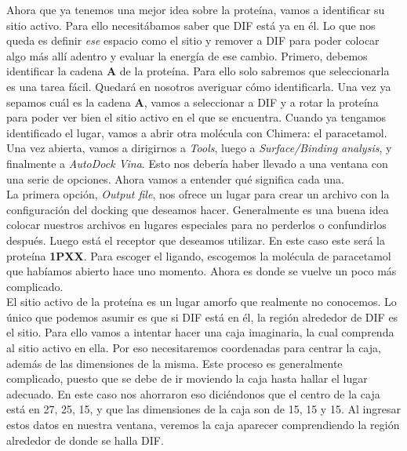 \documentclass[10pt,letterpaper]{article}
\begin{document}
Ahora que ya tenemos una mejor idea sobre la prote\'ina, vamos a identificar su sitio activo. Para ello necesit\'abamos saber que DIF est\'a ya en \'el. Lo que nos queda es definir \emph{ese} espacio como el sitio y remover a DIF para poder colocar algo m\'as all\'i adentro y evaluar la energ\'ia de ese cambio. Primero, debemos identificar la cadena \textbf{A} de la prote\'ina. Para ello solo sabremos que seleccionarla es una tarea f\'acil. Quedar\'a en nosotros averiguar c\'omo identificarla. Una vez ya sepamos cu\'al es la cadena \textbf{A}, vamos a seleccionar a DIF y a rotar la prote\'ina para poder ver bien el sitio activo en el que se encuentra. Cuando ya tengamos identificado el lugar, vamos a abrir otra mol\'ecula con Chimera: el paracetamol. Una vez abierta, vamos a dirigirnos a \emph{Tools}, luego a \emph{Surface/Binding analysis}, y finalmente a \emph{AutoDock Vina}. Esto nos deber\'ia haber llevado a una ventana con una serie de opciones. Ahora vamos a entender qu\'e significa cada una.\\

La primera opci\'on, \emph{Output file}, nos ofrece un lugar para crear un archivo con la configuraci\'on del docking que deseamos hacer. Generalmente es una buena idea colocar nuestros archivos en lugares especiales para no perderlos o confundirlos despu\'es. Luego est\'a el receptor que deseamos utilizar. En este caso este ser\'a la prote\'ina \textbf{1PXX}. Para escoger el ligando, escogemos la mol\'ecula de paracetamol que hab\'iamos abierto hace uno momento. Ahora es donde se vuelve un poco m\'as complicado.\\

El sitio activo de la prote\'ina es un lugar amorfo que realmente no conocemos. Lo \'unico que podemos asumir es que si DIF est\'a en \'el, la regi\'on alrededor de DIF es el sitio. Para ello vamos a intentar hacer una caja imaginaria, la cual comprenda al sitio activo en ella. Por eso necesitaremos coordenadas para centrar la caja, adem\'as de las dimensiones de la misma. Este proceso es generalmente complicado, puesto que se debe de ir moviendo la caja hasta hallar el lugar adecuado. En este caso nos ahorraron eso dici\'endonos que el centro de la caja est\'a en 27, 25, 15, y que las dimensiones de la caja son de 15, 15 y 15. Al ingresar estos datos en nuestra ventana, veremos la caja aparecer comprendiendo la regi\'on alrededor de donde se halla DIF.\\
\end{document}
